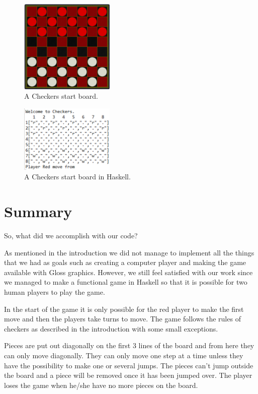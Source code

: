 \documentclass[12pt,a4paper]{article}
\begin{document}
\begin{figure}

  \begin{center}
  	\includegraphics[width= 0.4\textwidth]{Startboarexample.PNG}
  \end{center}
	\caption{A Checkers start board.}
	\label{fig:Checkers}
\end{figure}
\begin{figure}
	\begin{center}
		\includegraphics[width= 0.4\textwidth]{start.PNG}
	\end{center}
	\caption{A Checkers start board in Haskell.}
	\label{fig:Ch}
\end{figure}
\section{Summary}
So, what did we accomplish with our code? 

As mentioned in the introduction we did not manage to implement all the things that we had as goals such as creating a computer player and making the game available with Gloss graphics. However, we still feel satisfied with our work since we managed to make a functional game in Haskell so that it is possible for two human players to play the game.

In the start of the game it is only possible for the red player to make the first move and then the players take turns to move. The game follows the rules of checkers as described in the introduction with some small exceptions.

Pieces are put out diagonally on the first 3 lines of the board and from here they can only move diagonally. They can only move one step at a time unless they have the possibility to make one or several jumps. The pieces can’t jump outside the board and a piece will be removed once it has been jumped over. The player loses the game when he/she have no more pieces on the board. 
\end{document}
